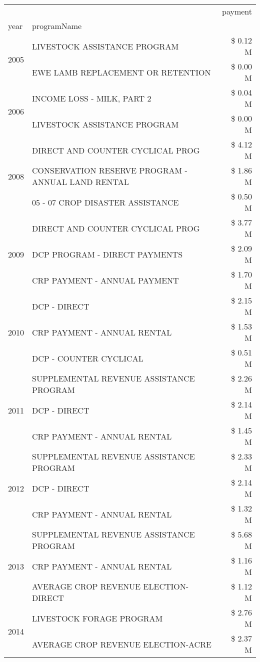 \begin{tabular}{llr}
\toprule
 &  & payment \\
year & programName &  \\
\midrule
\multirow[t]{2}{*}{2005} & LIVESTOCK ASSISTANCE PROGRAM & \$ 0.12 M \\
 & EWE LAMB REPLACEMENT OR RETENTION & \$ 0.00 M \\
\cline{1-3}
\multirow[t]{2}{*}{2006} & INCOME LOSS - MILK, PART 2 & \$ 0.04 M \\
 & LIVESTOCK ASSISTANCE PROGRAM & \$ 0.00 M \\
\cline{1-3}
\multirow[t]{3}{*}{2008} & DIRECT AND COUNTER CYCLICAL PROG & \$ 4.12 M \\
 & CONSERVATION RESERVE PROGRAM - ANNUAL LAND RENTAL & \$ 1.86 M \\
 & 05 - 07 CROP DISASTER ASSISTANCE & \$ 0.50 M \\
\cline{1-3}
\multirow[t]{3}{*}{2009} & DIRECT AND COUNTER CYCLICAL PROG & \$ 3.77 M \\
 & DCP PROGRAM - DIRECT PAYMENTS & \$ 2.09 M \\
 & CRP PAYMENT - ANNUAL PAYMENT & \$ 1.70 M \\
\cline{1-3}
\multirow[t]{3}{*}{2010} & DCP - DIRECT & \$ 2.15 M \\
 & CRP PAYMENT - ANNUAL RENTAL & \$ 1.53 M \\
 & DCP - COUNTER CYCLICAL & \$ 0.51 M \\
\cline{1-3}
\multirow[t]{3}{*}{2011} & SUPPLEMENTAL REVENUE ASSISTANCE PROGRAM & \$ 2.26 M \\
 & DCP - DIRECT & \$ 2.14 M \\
 & CRP PAYMENT - ANNUAL RENTAL & \$ 1.45 M \\
\cline{1-3}
\multirow[t]{3}{*}{2012} & SUPPLEMENTAL REVENUE ASSISTANCE PROGRAM & \$ 2.33 M \\
 & DCP - DIRECT & \$ 2.14 M \\
 & CRP PAYMENT - ANNUAL RENTAL & \$ 1.32 M \\
\cline{1-3}
\multirow[t]{3}{*}{2013} & SUPPLEMENTAL REVENUE ASSISTANCE PROGRAM & \$ 5.68 M \\
 & CRP PAYMENT - ANNUAL RENTAL & \$ 1.16 M \\
 & AVERAGE CROP REVENUE ELECTION-DIRECT & \$ 1.12 M \\
\cline{1-3}
\multirow[t]{3}{*}{2014} & LIVESTOCK FORAGE PROGRAM & \$ 2.76 M \\
 & AVERAGE CROP REVENUE ELECTION-ACRE & \$ 2.37 M \\

\end{tabular}

